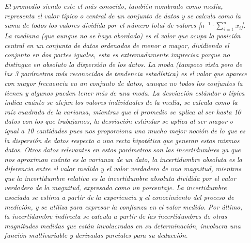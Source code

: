 \documentclass{article}
\begin{document}
\textit{El promedio siendo este el más conocido, también nombrado como media, representa el valor típico o central de un conjunto de datos y se calcula como la suma de todos los valores dividida por el número total de valores [$n^{-1} \cdot \sum_{i=1}^n x_i$]. La mediana (que aunque no se haya abordado) es el valor que ocupa la posición central en un conjunto de datos ordenados de menor a mayor, dividiendo el conjunto en dos partes iguales, esta es extremadamente imprecisa porque no distingue en absoluto la dispersión de los datos. La moda (tampoco vista pero de las 3 parámetros más reconocidos de tendencia estadística) es el valor que aparece con mayor frecuencia en un conjunto de datos, aunque no todos los conjuntos la tienen y algunos pueden tener más de una moda. La desviación estándar o típica indica cuánto se alejan los valores individuales de la media, se calcula como la raíz cuadrada de la varianza, mientras que el promedio se aplica al ser hasta 10 datos con los que trabajamos, la desviación estándar se aplica al ser mayor o igual a 10 cantidades pues nos proporciona una mucho mejor noción de lo que es la dispersión de datos respecto a una recta hipotética que generan estos mismos datos. Otros datos relevantes en estos parámetros son las incertidumbres ya que nos aproximan cuánta es la varianza de un dato, la incertidumbre absoluta es la diferencia entre el valor medido y el valor verdadero de una magnitud, mientras que la incertidumbre relativa es la incertidumbre absoluta dividida por el valor verdadero de la magnitud, expresada como un porcentaje. La incertidumbre asociada se estima a partir de la experiencia y el conocimiento del proceso de medición, y se utiliza para expresar la confianza en el valor medido. Por último, la incertidumbre indirecta se calcula a partir de las incertidumbres de otras magnitudes medidas que están involucradas en su determinación, involucra una función multivariable y derivadas parciales para su deducción.}
\end{document}

